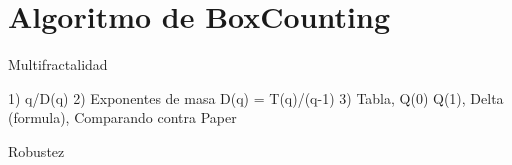 \section{Algoritmo de BoxCounting}


Multifractalidad

1) q/D(q)
2) Exponentes de masa D(q) = T(q)/(q-1)
3) Tabla, Q(0) Q(1), Delta (formula), Comparando contra Paper

Robustez
